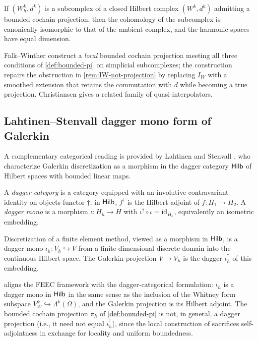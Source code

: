 \begin{theorem}\label{thm:afw-cohomology}
If $(W_h^k, d^k)$ is a subcomplex of a closed Hilbert complex
$(W^k, d^k)$ admitting a bounded cochain projection, then the
cohomology of the subcomplex is canonically isomorphic to that of
the ambient complex, and the harmonic spaces have equal dimension.
\end{theorem}

Falk--Winther \cite{FalkWinther2014} construct a \emph{local}
bounded cochain projection meeting all three conditions of
\cref{def:bounded-pi} on simplicial subcomplexes; the construction
repairs the obstruction in \cref{rem:IW-not-projection} by replacing
$I_W$ with a smoothed extension that retains the commutation with
$d$ while becoming a true projection. Christiansen
\cite[\S 4]{Christiansen2010} gives a related family of
quasi-interpolators.

\subsection{Lahtinen--Stenvall dagger mono form of Galerkin}\label{subsec:feec-dagger}

A complementary categorical reading is provided by Lahtinen and
Stenvall \cite{LahtinenStenvall2020}, who characterize Galerkin
discretization as a morphism in the dagger category
$\mathsf{Hilb}$ of Hilbert spaces with bounded linear maps.

A \emph{dagger category} \cite{HeunenVicary2019} is a category
equipped with an involutive contravariant identity-on-objects functor
$\dagger$; in $\mathsf{Hilb}$, $f^\dagger$ is the Hilbert adjoint of
$f : H_1 \to H_2$. A \emph{dagger mono} is a morphism
$\iota : H_h \to H$ with $\iota^\dagger \circ \iota = \mathrm{id}_{H_h}$,
equivalently an isometric embedding.

\begin{proposition}\label{prop:galerkin-dagger}
Discretization of a finite element method, viewed as a morphism in
$\mathsf{Hilb}$, is a dagger mono $\iota_h : V_h \hookrightarrow V$ from a
finite-dimensional discrete domain into the continuous Hilbert
space. The Galerkin projection $V \to V_h$ is the dagger
$\iota_h^\dagger$ of this embedding.
\end{proposition}

 aligns the FEEC framework with the
dagger-categorical formulation: $\iota_h$ is a dagger mono in
$\mathsf{Hilb}$ in the same sense as the inclusion of the Whitney form
subspace $V_W^k \hookrightarrow \Lambda^k(\Omega)$, and the Galerkin
projection is its Hilbert adjoint. The bounded cochain projection
$\pi_h$ of \cref{def:bounded-pi} is not, in general, a dagger
projection (i.e., it need not equal $\iota_h^\dagger$), since the
local construction of \cite{FalkWinther2014} sacrifices
self-adjointness in exchange for locality and uniform boundedness.


